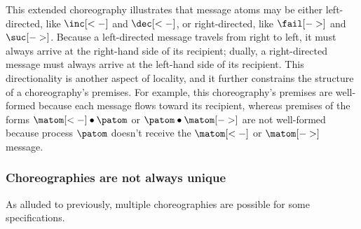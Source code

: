 This extended choreography illustrates that message atoms may be either left-directed, like $\inc[<-]$ and $\dec[<-]$, or right-directed, like $\fail[->]$ and $\suc[->]$.
% 
Because a left-directed message travels from right to left, it must always arrive at the right-hand side of its recipient; dually, a right-directed message must always arrive at the left-hand side of its recipient.
This directionality is another aspect of locality, and it further constrains the structure of a choreography's premises.
For example, this choreography's premises are well-formed because each message flows toward its recipient, whereas premises of the forms $\matom[<-] \fuse \patom$ or $\patom \fuse \matom[->]$ are not well-formed because process $\patom$ doesn't receive the $\matom[<-]$ or $\matom[->]$ message.



\subsubsection{Choreographies are not always unique}\label{sec:mult-chor-are}

As alluded to previously, multiple choreographies are possible for some specifications.

